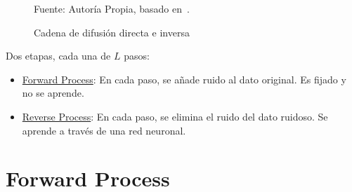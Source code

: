 \documentclass{beamer}
\begin{document}
\begin{frame}
\begin{figure}
    \caption{Cadena de difusión directa e inversa}
    \label{fig:diffusion_chain}

    \vspace{-1em}
    {\tiny \color{gray} Fuente: Autoría Propia, basado en~\cite{lai2026principlesdiffusionmodels}.}
    \end{figure}
    
    Dos etapas, cada una de $L$ pasos:
    \begin{itemize}
        \item<1-> \ul{Forward Process}: En cada paso, se añade ruido al dato original. Es fijado y no se aprende.
        \item<2-> \ul{Reverse Process}: En cada paso, se elimina el ruido del dato ruidoso. Se aprende a través de una red neuronal.
    \end{itemize}
\end{frame}

\section{Forward Process}
\end{document}
